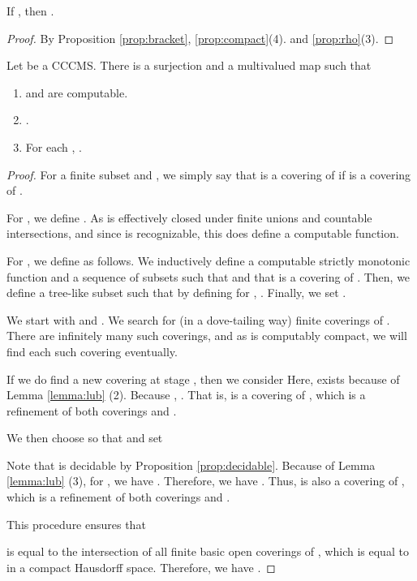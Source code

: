 \documentclass{eptcs-modified}
\begin{document}
\begin{lemma}\label{lem:rhobracket}
  If , then  .
\end{lemma}
\begin{proof}
  By Proposition \ref{prop:bracket},
  \ref{prop:compact}(4). and \ref{prop:rho}(3).
\end{proof}



\begin{proposition}\label{prop:nicefunctionsgeneral}
Let  be a CCCMS.
There is a surjection  and a multivalued map  such that
\begin{enumerate}
\item  and  are computable.
\item .
\item For each , .
\end{enumerate}

\begin{proof}
For a finite subset  and , we simply say that  is a covering of  if
 is a covering of .

For , we define .
As  is effectively closed under finite unions and countable intersections,
and since  is recognizable, this does define a computable function.

For , we define  as follows.
We inductively define a computable strictly monotonic function  and
a sequence  of subsets  such that
 and that
 is a covering of .
Then, we define a tree-like subset  such that
 by defining for ,
. Finally, we set .



We start with  and .
We search for (in a dove-tailing way) finite coverings  of .
There are infinitely many such coverings, and
as  is computably compact, we will find each such covering eventually.

If we do find a new covering  at stage , then we consider
  Here,   exists because of Lemma \ref{lemma:lub} (2).
Because ,
.  That is,   is
a covering of , which is a refinement of both coverings  and .


We then choose  so that  and set

Note that  is decidable  by Proposition \ref{prop:decidable}.
Because of Lemma \ref{lemma:lub} (3), for ,
we have .
Therefore,
we have .
Thus,  is also
a covering of , which is a refinement of both coverings  and .

This procedure ensures that

is equal to the intersection of all finite basic open coverings of , which is equal to  in a compact Hausdorff space.  Therefore, we have .





\end{proof}
\end{proposition}
\end{document}
